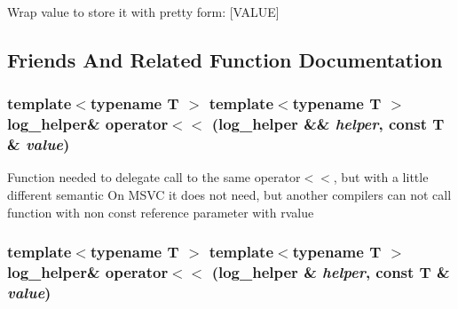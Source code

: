 Wrap value to store it with pretty form: \mbox{[}VALUE\mbox{]} 

\subsection{Friends And Related Function Documentation}
\hypertarget{classhope_1_1final_e477d848d5b78d071e802988f5d72584}{
\subsubsection[{operator$<$$<$}]{\setlength{\rightskip}{0pt plus 5cm}template$<$typename T $>$ template$<$typename T $>$ log\_\-helper\& operator$<$$<$ (log\_\-helper \&\& {\em helper}, \/  const T \& {\em value})}}
\label{classhope_1_1final_e477d848d5b78d071e802988f5d72584}


Function needed to delegate call to the same operator$<$$<$, but with a little different semantic On MSVC it does not need, but another compilers can not call function with non const reference parameter with rvalue \hypertarget{classhope_1_1final_4b8322ee0fd5ae2a2a0a9052876e6f8d}{
\subsubsection[{operator$<$$<$}]{\setlength{\rightskip}{0pt plus 5cm}template$<$typename T $>$ template$<$typename T $>$ log\_\-helper\& operator$<$$<$ (log\_\-helper \& {\em helper}, \/  const T \& {\em value})}}
\label{classhope_1_1final_4b8322ee0fd5ae2a2a0a9052876e6f8d}


